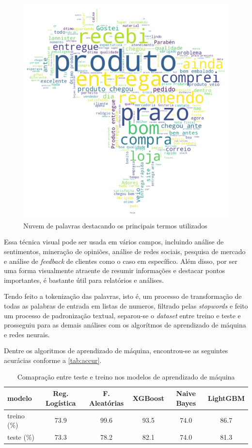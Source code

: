 \begin{figure}[H]
    \centering
    \includegraphics[scale=0.8]{./figs/word_cloud.png}
    \caption{Nuvem de palavras destacando os principais termos utilizados}
    \label{fig:wordCloud}
\end{figure}

Essa técnica visual pode ser usada em vários campos, incluindo análise de sentimentos, mineração de opiniões, análise de redes sociais, pesquisa de mercado e análise de \textit{feedback} de clientes como o caso em específico. Além disso, por ser uma forma visualmente atraente de resumir informações e destacar pontos importantes, é bastante útil para relatórios e análises.

Tendo feito a tokenização das palavras, isto é, um processo de transformação de todas as palabras de entrada em listas de numeros, filtrado pelas \textit{stopwords} e feito um processo de padronização textual, separou-se o \textit{dataset} entre treino e teste e prosseguiu para as demais análises com os algorítmos de aprendizado de máquina e redes neurais.

Dentre os algoritmos de aprendizado de máquina, encontrou-se as seguintes acurácias conforme a \autoref{tab:accur}.

\begin{table}[H]
    \centering
    \begin{tabular}{l|ccccc}
        \hline
        { modelo}      & { Reg. Logística} & { F. Aleatórias} & { XGBoost} & { Naive Bayes} & LightGBM \\ \hline\hline
        { treino (\%)} & { 73.9}           & { 99.6}          & { 93.5}    & { 74.0}        & 86.7     \\\hline
        { teste (\%)}  & { 73.3}           & { 78.2}          & { 82.1}    & { 74.0}        & 81.3
    \end{tabular}
    \caption{Comapração entre teste e treino nos modelos de aprendizado de máquina}
    \label{tab:accur}
\end{table}

